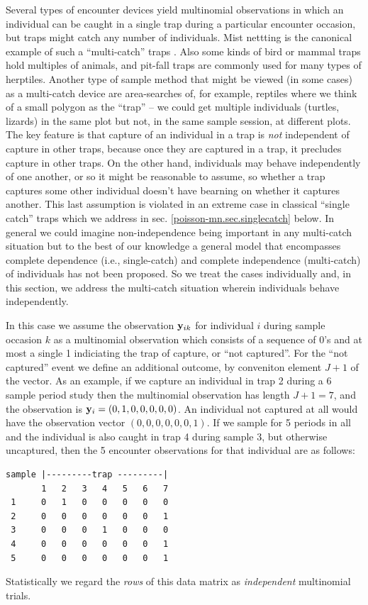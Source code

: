 Several types of encounter devices yield multinomial observations in
which an individual can be caught in a single trap during a particular
encounter occasion, but traps might catch any number of individuals.
Mist nettting is the canonical example of such a ``multi-catch'' traps
\citep{efford_etal:2009euring}. Also some kinds of bird or mammal
traps hold multiples of animals, and pit-fall traps are commonly used
for many types of herptiles.  Another type of sample method that might
be viewed (in some cases) as a multi-catch device are area-searches
of, for example, reptiles where we think of a small polygon as the
``trap'' -- we could get multiple individuals (turtles, lizards) in
the same plot but not, in the same sample session, at different plots.
The key feature is that capture of an individual in a trap is {\it
  not} independent of capture in other traps, because once they are
captured in a trap, it precludes capture in other traps.  On the other
hand, individuals may behave independently of one another, or so it
might be reasonable to assume, so whether a trap captures some other
individual doesn't have bearning on whether it captures another.  This
last assumption is violated in an extreme case in classical ``single
catch'' traps which we address in
sec. \ref{poisson-mn.sec.singlecatch} below. In general we could
imagine non-independence being important in any multi-catch situation
but to the best of our knowledge a general model that encompasses
complete dependence (i.e., single-catch) and complete independence
(multi-catch) of individuals has not been proposed.  So we treat the
cases individually and, in this section, we address the multi-catch
situation wherein individuals behave independently.


In this case we assume the observation ${\bf y}_{ik}$ for individual
$i$ during sample occasion $k$ as a multinomial observation which
consists of a sequence of 0's and at most a single 1 indiciating the
trap of capture, or ``not captured''. For the ``not captured'' event
we define an additional outcome, by conveniton element $J+1$ of the
vector.  As an example, if we capture an individual in trap 2 during a
6 sample period study then the multinomial observation has length $J+1
= 7$, and the observation is ${\bf y}_{i} = (0,1,0,0,0,0,0)$. An
individual not captured at all would have the observation vector
$(0,0,0,0,0,0,1)$.  If we sample for 5 periods in all and the
individual is also caught in trap 4 during sample 3, but otherwise
uncaptured, then the 5 encounter observations for that individual are
as follows:
\begin{verbatim}
sample |---------trap ---------|
       1   2   3   4   5   6   7
 1     0   1   0   0   0   0   0
 2     0   0   0   0   0   0   1
 3     0   0   0   1   0   0   0
 4     0   0   0   0   0   0   1
 5     0   0   0   0   0   0   1
\end{verbatim}
Statistically we regard the {\it rows} of this data matrix as {\it
  independent} multinomial trials.

